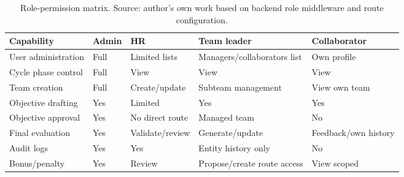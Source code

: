 \begin{table}[H]\centering\small
\caption{Role-permission matrix. Source: author's own work based on backend role middleware and route configuration.}
\label{tab:role-permission-diagram}
\begin{tabularx}{\textwidth}{lYYYY}
\toprule
Capability & Admin & HR & Team leader & Collaborator\\
\midrule
User administration & Full & Limited lists & Managers/collaborators list & Own profile\\
Cycle phase control & Full & View & View & View\\
Team creation & Full & Create/update & Subteam management & View own team\\
Objective drafting & Yes & Limited & Yes & Yes\\
Objective approval & Yes & No direct route & Managed team & No\\
Final evaluation & Yes & Validate/review & Generate/update & Feedback/own history\\
Audit logs & Yes & Yes & Entity history only & No\\
Bonus/penalty & Yes & Review & Propose/create route access & View scoped\\
\bottomrule
\end{tabularx}
\end{table}
